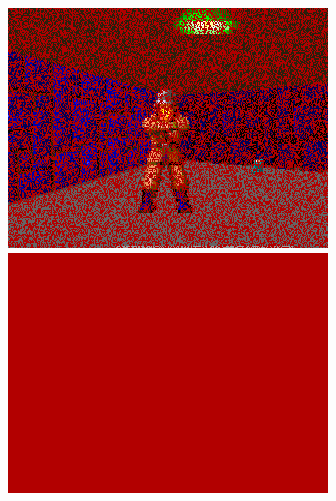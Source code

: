 \begin{minipage}{\textwidth}
\centering
  \includegraphics[width=.9\textwidth]{screenshots/fizzlefade/dying/screenshot_52.png} \\
  \vspace*{0.5cm}
  \includegraphics[width=.9\textwidth]{screenshots/fizzlefade/dying/screenshot_86.png} \\
\end{minipage}


